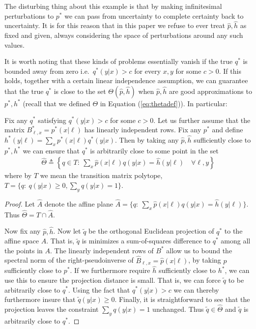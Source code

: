 The disturbing thing about this example is that by making infinitesimal perturbations to $p^*$ we can pass from uncertainty to complete certainty back to uncertainty.  It is for this reason that in this paper we refuse to ever treat $\hat p,\hat h$ as fixed and given, always considering the space of perturbations around any such values.  

It is worth noting that these kinds of problems essentially vanish if the true $q^*$ is bounded away from zero i.e.\ $q^*(y|x)>c$ for every $x,y$ for some $c>0$.  If this holds, together with a certain linear independence assumption, we can guarantee that the true $q^*$ is close to the set $\Theta(\hat p,\hat h)$ when $\hat p,\hat h$ are good approximations to $p^*,h^*$ (recall that we defined $\Theta$ in Equation (\ref{eq:thetadef})).  In particular:\vspace{.1in}

\begin{thm}\label{thm:mainthm}
Fix any $q^*$ satisfying $q^*(y|x)>c$ for some $c>0$.  Let us further assume that the matrix $B^*_{\ell,x}=p^*(x|\ell)$ has linearly independent rows.  Fix any $p^*$ and define $h^*(y|\ell)=\sum_x p^*(x|\ell)q^*(y|x)$.  Then by taking any $\hat p,\hat h$ sufficiently close to $p^*,h^*$ we can ensure that $q^*$ is arbitrarily close to some point in the set 
\begin{align}
\hat \Theta \triangleq \left\{q\in T:\ \sum_x \hat p(x|\ell)q(y|x)= \hat  h(y|\ell) \quad \forall \ell,y \right\}
\end{align}
where by $T$ we mean the transition matrix polytope, $T=\{q:\ q(y|x)\geq 0, \sum_y q(y|x)=1\}$.
\end{thm}
\begin{proof}
Let $\hat A$ denote the affine plane $\hat A=\{q:\ \sum_x \hat p(x|\ell)q(y|x)= \hat  h(y|\ell)\}$.  Thus $\hat \Theta = T \cap \hat A$.

Now fix any $\hat p,\hat h$.  Now let $\tilde q$ be the orthogonal Euclidean projection of $q^*$ to the affine space $A$.  That is, $\tilde q$ is minimizes a sum-of-squares difference to $q^*$ among all the points in $A$.  The linearly independent rows of $B^*$ allow us to bound the spectral norm of the right-pseudoinverse of $\hat B_{\ell,x}=\hat p(x|\ell)$, by taking $\hat p$ sufficiently close to $p^*$.  If we furthermore require $\hat h$ sufficiently close to $h^*$, we can use this to ensure the projection distance is small.  That is, we can force $\tilde q$ to be arbitrarily close to $q^*$.  Using the fact that $q^*(y|x)>c$ we can thereby furthermore insure that $\tilde q(y|x)\geq0$.  Finally, it is straightforward to see that the projection leaves the constraint $\sum_y q(y|x)=1$ unchanged.  Thus $\tilde q\in \hat \Theta$ and $\tilde q$ is arbitrarily close to $q^*$. 
\end{proof}

